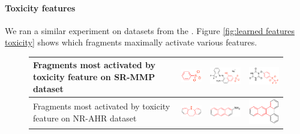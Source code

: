 \documentclass{article}
\begin{document}
\paragraph{Toxicity features}
We ran a similar experiment on datasets from the \citet{tox21}.
Figure \ref{fig:learned features toxicity} shows which fragments maximally activate various features.
\newcommand{\molfeaturetox}[2]{\texttt{[image: ../../DeepMoleculesData/experiments/2015-05-30-visualize-fps/5-toxic-diff-dataset/figures/fp\_\#1\_highlight\_\#2.pdf]}}%
\begin{figure}[h]
\begin{tabular}{>{\centering}m{1in} >{\centering}m{3.1cm} >{\centering}m{3.3cm} >{\centering\arraybackslash}m{3.1cm}}
Fragments most activated by toxicity feature on SR-MMP dataset
& \includegraphics[width=2.2cm]{figures/jorge-figures/7.png} 
& \includegraphics[width=3.3cm]{figures/jorge-figures/8.png}
& \includegraphics[width=3.3cm]{figures/jorge-figures/9.png}\\
\midrule
Fragments most activated by toxicity feature on NR-AHR dataset
& \includegraphics[width=2.2cm]{figures/jorge-figures/10.png} 
& \includegraphics[width=3.3cm]{figures/jorge-figures/11.png}
& \includegraphics[width=2.9cm]{figures/jorge-figures/12.png}\\

\end{tabular}
\end{figure}
\end{document}
